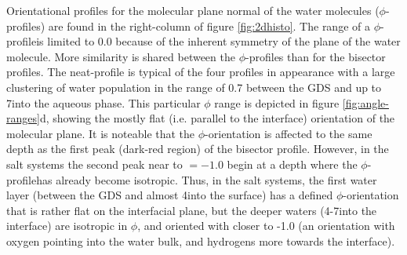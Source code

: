

\newcommand{\phiprof}{$\phi$-profile}

Orientational profiles for the molecular plane normal of the water molecules (\phiprof s) are found in the right-column of figure \ref{fig:2dhisto}. The range of a \phiprof is limited to 0.0 because of the inherent symmetry of the plane of the water molecule. More similarity is shared between the \phiprof s than for the bisector profiles. The neat-\wat profile is typical of the four profiles in appearance with a large clustering of water population in the range of 0.7 between the GDS and up to 7\angs into the aqueous phase. This particular $\phi$ range is depicted in figure \ref{fig:angle-ranges}d, showing the mostly flat (i.e. parallel to the interface) orientation of the molecular plane. It is noteable that the $\phi$-orientation is affected to the same depth as the first peak (dark-red region) of the bisector profile. However, in the salt systems the second peak near to \costheta$=-1.0$ begin at a depth where the \phiprof has already become isotropic. Thus, in the salt systems, the first water layer (between the GDS and almost 4\angs into the surface) has a defined $\phi$-orientation that is rather flat on the interfacial plane, but the deeper waters (4-7\angs into the interface) are isotropic in $\phi$, and oriented with \costheta closer to -1.0 (an orientation with oxygen pointing into the water bulk, and hydrogens more towards the interface).

